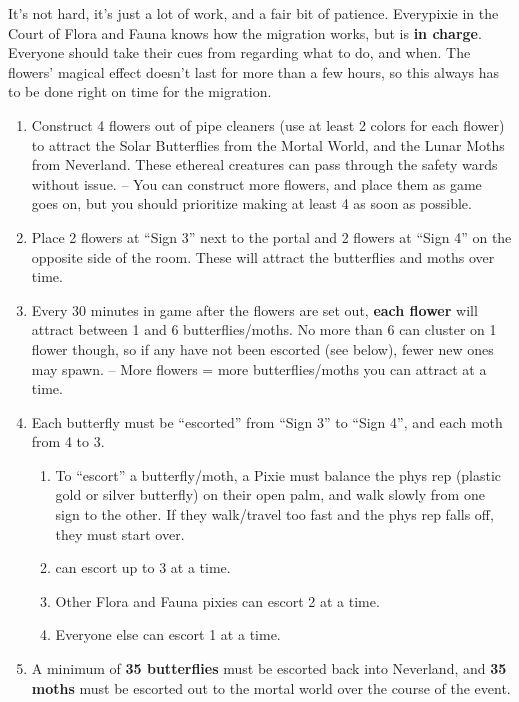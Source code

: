 \documentclass[green]{PP}
\begin{document}
\name{\gButterfly{}}

It’s not hard, it’s just a lot of work, and a fair bit of patience. Everypixie in the Court of Flora and Fauna knows how the migration works, but \cFButterfly{} is \textbf{in charge}. Everyone should take their cues from \cFButterfly{\them} regarding what to do, and when.  The flowers' magical effect doesn't last for more than a few hours, so this always has to be done right on time for the migration.

\begin{enumerate}
	\item Construct 4 flowers out of pipe cleaners (use at least 2 colors for each flower) to attract the Solar Butterflies from the Mortal World, and the Lunar Moths from Neverland. These ethereal creatures can pass through the safety wards without issue. -- You can construct more flowers, and place them as game goes on, but you should prioritize making at least 4 as soon as possible.
	\item Place 2 flowers at “Sign 3” next to the portal and 2 flowers at “Sign 4” on the opposite side of the room. These will attract the butterflies and moths over time.
	\item Every 30 minutes in game after the flowers are set out, \textbf{each flower} will attract between 1 and 6 butterflies/moths. No more than 6 can cluster on 1 flower though, so if any have not been escorted (see below), fewer new ones may spawn. -- More flowers = more butterflies/moths you can attract at a time.
	\item Each butterfly must be “escorted” from “Sign 3” to “Sign 4”, and each moth from 4 to 3.
	\begin{enumerate}
		\item To “escort” a butterfly/moth, a Pixie must balance the phys rep (plastic gold or silver butterfly) on their open palm, and walk slowly from one sign to the other. If they walk/travel too fast and the phys rep falls off, they must start over.
		\item \cFButterfly{} can escort up to 3 at a time.
		\item Other Flora and Fauna pixies can escort 2 at a time.
		\item Everyone else can escort 1 at a time.
	\end{enumerate}
	\item A minimum of \textbf{35 butterflies }must be escorted back into Neverland, and \textbf{35 moths }must be escorted out to the mortal world over the course of the event.
		\begin{enumerate}

\end{enumerate}
\end{enumerate}
\end{document}
